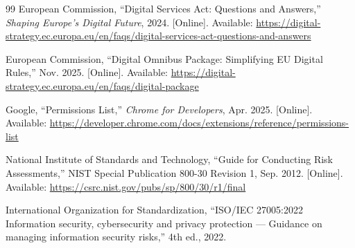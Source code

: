 \documentclass[12pt,oneside]{report}
\begin{document}
\begin{thebibliography}{99}
European Commission,
``Digital Services Act: Questions and Answers,''
\textit{Shaping Europe's Digital Future}, 2024.
[Online]. Available: \url{https://digital-strategy.ec.europa.eu/en/faqs/digital-services-act-questions-and-answers}

European Commission,
``Digital Omnibus Package: Simplifying EU Digital Rules,''
Nov. 2025.
[Online]. Available: \url{https://digital-strategy.ec.europa.eu/en/faqs/digital-package}

Google,
``Permissions List,''
\textit{Chrome for Developers}, Apr. 2025.
[Online]. Available: \url{https://developer.chrome.com/docs/extensions/reference/permissions-list}


National Institute of Standards and Technology,
``Guide for Conducting Risk Assessments,''
NIST Special Publication 800-30 Revision 1, Sep. 2012.
[Online]. Available: \url{https://csrc.nist.gov/pubs/sp/800/30/r1/final}

International Organization for Standardization,
``ISO/IEC 27005:2022 Information security, cybersecurity and privacy protection --- Guidance on managing information security risks,''
4th ed., 2022.

\end{thebibliography}
\end{document}
